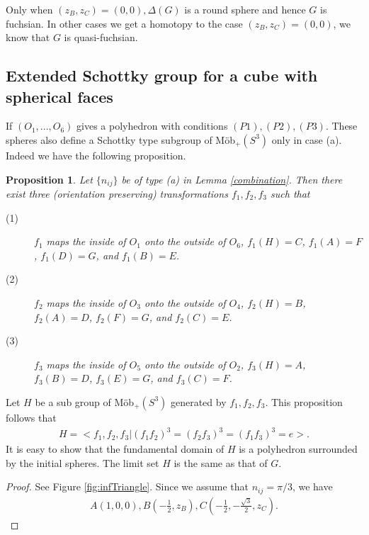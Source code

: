 \documentclass[dvipdfmx]{interact}
\theoremstyle{plain}%
\newtheorem{proposition}[theorem]{Proposition}
\theoremstyle{definition}
\theoremstyle{remark}
\theoremstyle{problemstyle}
\begin{document}
Only when $(z_B, z_C) =(0, 0), \Delta(G)$ is a round sphere and hence
$G$ is fuchsian. In other cases we get a homotopy to the case 
$(z_B, z_C) = (0, 0)$, we know that $G$ is quasi-fuchsian.

\subsection{Extended Schottky group for a cube with spherical faces}\label{extend}
If $(O_1, ..., O_6)$ gives a polyhedron with conditions
$(P1), (P2), (P3)$.
These spheres also define a Schottky type subgroup of M\"ob$_+(S^3)$ 
only in case (a). Indeed we have the following  proposition.

\begin{proposition}
Let $\{n_{ij}\}$ be of type (a) in Lemma \ref{combination}. Then there exist three
 (orientation preserving) transformations $f_1, f_2, f_3$ such that
 \begin{description}
  \item[(1)] $f_1$ maps the inside of $O_1$ onto the outside of
             $O_6$, $f_1(H) = C$, $f_1(A) = F$,  $f_1(D) = G$, and
             $f_1(B) = E$.
  \item[(2)] $f_2$ maps the inside of $O_3$ onto the outside of
             $O_4$, $f_2(H) = B$, $f_2(A) = D$,  $f_2(F) = G$, and
             $f_2(C) = E$.             
  \item[(3)] $f_3$ maps the inside of $O_5$ onto the outside of
             $O_2$, $f_3(H) = A$, $f_3(B) = D$,  $f_3(E) = G$, and
             $f_3(C) = F$.
\end{description}
\end{proposition}

Let $H$ be a sub group of M\"ob$_+(S^3)$ generated by $f_1, f_2,
f_3$. This proposition follows that
\begin{align*}
 H = <f_1, f_2, f_3|(f_1f_2)^3 = (f_2f_3)^3 = (f_1f_3)^3 = e>.
\end{align*}
It is easy to show that the fundamental domain of $H$ is a polyhedron
surrounded by the initial spheres. The limit set $H$ is the same as that
of $G$.

\begin{proof}
See Figure \ref{fig:infTriangle}. Since we assume that $n_{ij} = \pi/3$, we have
\begin{align*}
 A(1, 0, 0), B(-\frac{1}{2}, z_B), C(-\frac{1}{2}, -\frac{\sqrt{3}}{2}, z_C).
\end{align*}
\end{proof}
\end{document}
